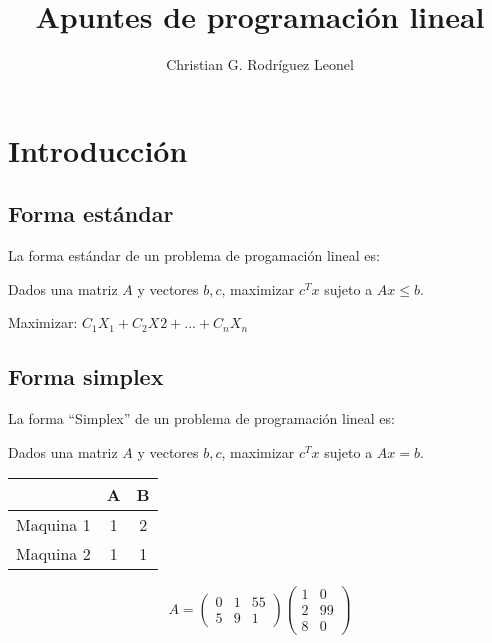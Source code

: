 \documentclass{article}
\title{Apuntes de programaci\'on lineal}
\author{Christian G. Rodr\'iguez Leonel}
\begin{document}
\maketitle

\tableofcontents

\section{Introducción}

\label{sec:introduccion}

\subsection{Forma estándar}





La forma estándar de un problema de progamación lineal es:

Dados una matriz $A$ y vectores $b,c$, maximizar $c^{T}x$ sujeto a $Ax\leq b$.

Maximizar: $C_{1}X_{1}+ C_{2}X_{}2+ ... +C_{n}X_{n}$


\subsection{Forma simplex}


La forma ``Simplex'' de un problema de programación lineal es:

Dados una matriz $A$ y vectores $b,c$, maximizar $c^{T}x$ sujeto a $Ax=b$.

\begin{tabular}{c|c|c}
  & A & B \\
  \hline
  
  Maquina 1 & 1 & 2 \\
  Maquina 2 & 1 & 1

\end{tabular}

\begin{equation}
  \label{eq:1}
 A=
  \begin{pmatrix}
    0 & 1 & 55\\
    5 & 9 & 1
  \end{pmatrix}
  \begin{pmatrix}
    1 & 0\\
    2 & 99 \\
    8 & 0
  \end{pmatrix}
\end{equation}
\end{document}
